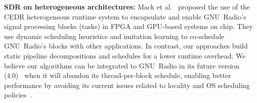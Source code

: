 \textbf{SDR on heterogeneous architectures:} Mack et al.~\cite{mack2022gnu} proposed the use of the CEDR heterogeneous runtime system to encapsulate and enable GNU~Radio’s signal processing blocks (tasks) in FPGA and GPU-based systems on chip.
They use dynamic scheduling heuristics and imitation learning to co-schedule GNU~Radio’s blocks with other applications.
In contrast, our approaches build static pipeline decompositions and schedules for a lower runtime overhead.
We believe our algorithms can be integrated to GNU~Radio in its future version (4.0)~\cite{morman2022thefuture} when it will abandon its thread-per-block schedule, enabling better performance by avoiding its current issues related to locality and OS scheduling policies~\cite{bloessl2019benchmarking}.